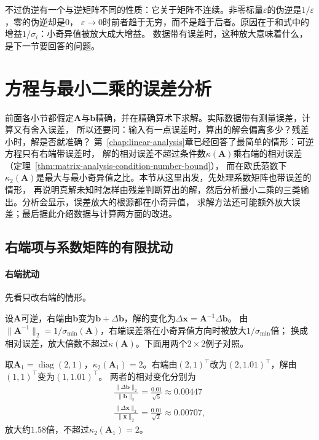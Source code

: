 不过伪逆有一个与逆矩阵不同的性质：它关于矩阵不连续。非零标量$\varepsilon$的伪逆是$1/\varepsilon$，零的伪逆却是$0$，
$\varepsilon\to0$时前者趋于无穷，而不是趋于后者。原因在于和式中的增益$1/\sigma_i$：小奇异值被放大成大增益。
数据带有误差时，这种放大意味着什么，是下一节要回答的问题。

\section{方程与最小二乘的误差分析}
\label{sec:ls-numerical-sensitivity}

前面各小节都假定$\bm A$与$\bm b$精确，并在精确算术下求解。实际数据带有测量误差，计算又有舍入误差，
所以还要问：输入有一点误差时，算出的解会偏离多少？残差小时，解是否就准确？
第~\ref{chap:linear-analysis}章已经回答了最简单的情形：可逆方程只有右端带误差时，
解的相对误差不超过条件数$\kappa(\bm A)$乘右端的相对误差（定理~\ref{thm:matrix-analysis-condition-number-bound}），
而在欧氏范数下$\kappa_2(\bm A)$是最大与最小奇异值之比。本节从这里出发，先处理系数矩阵也带误差的情形，
再说明真解未知时怎样由残差判断算出的解，然后分析最小二乘的三类输出。分析会显示，误差放大的根源都在小奇异值，
求解方法还可能额外放大误差；最后据此介绍数据与计算两方面的改进。

\subsection{右端项与系数矩阵的有限扰动}
\label{sec:ls-equation-sensitivity}
\label{sec:ls-linear-system-sensitivity}

\paragraph{右端扰动}

先看只改右端的情形。

设$\bm A$可逆，右端由$\bm b$变为$\bm b+\Delta\bm b$，解的变化为$\Delta\bm x=\bm A^{-1}\Delta\bm b$。
由$\lVert\bm A^{-1}\rVert_2=1/\sigma_{\min}(\bm A)$，右端误差落在小奇异值方向时被放大$1/\sigma_{\min}$倍；
换成相对误差，放大倍数不超过$\kappa(\bm A)$。下面用两个$2\times2$例子对照。

\begin{example}[良态方程的右端扰动]
\label{ex:ls-rhs-perturbation-well-conditioned}
取$\bm A_1=\operatorname{diag}(2,1)$，$\kappa_2(\bm A_1)=2$。右端由$(2,1)^\top$改为$(2,1.01)^\top$，解由$(1,1)^\top$变为$(1,1.01)^\top$。
两者的相对变化分别为
\[
 \begin{gathered}
\frac{\lVert\Delta\bm b\rVert_2}{\lVert\bm b\rVert_2}=\frac{0.01}{\sqrt5}\approx0.00447\\
\frac{\lVert\Delta\bm x\rVert_2}{\lVert\bm x\rVert_2}=\frac{0.01}{\sqrt2}\approx0.00707,
 \end{gathered}
\]
放大约$1.58$倍，不超过$\kappa_2(\bm A_1)=2$。
\end{example}

